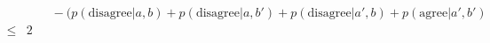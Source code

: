 \documentclass[12pt,a4]{article}
\begin{document}
\begin{enumerate}
\begin{enumerate}
\begin{align*}
          & \qquad  - (p(\text{disagree}|a, b) + p(\text{disagree}|a, b') + p(\text{disagree}|a', b) + p(\text{agree}|a', b')\\
      \le & 2
        \end{align*}

\end{enumerate}
\end{enumerate}
\end{document}
